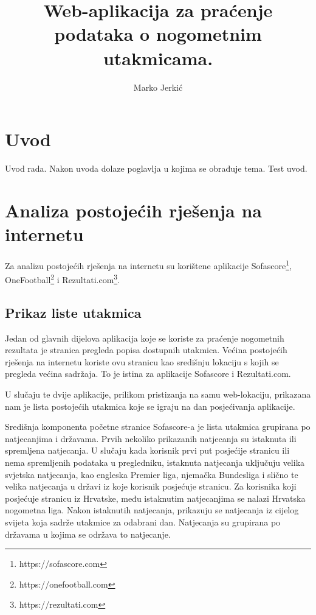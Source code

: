 \documentclass[times, utf8, zavrsni]{fer}
\begin{document}

\title{Web-aplikacija za praćenje podataka o nogometnim utakmicama.}

\author{Marko Jerkić}

\maketitle


\zahvala{}

\tableofcontents

\chapter{Uvod}
Uvod rada. Nakon uvoda dolaze poglavlja u kojima se obrađuje tema.
Test uvod.

\chapter{Analiza postojećih rješenja na internetu}
Za analizu postojećih rješenja na internetu su korištene aplikacije Sofascore\footnote{https://sofascore.com}, OneFootball\footnote{https://onefootball.com} i Rezultati.com\footnote{https://rezultati.com}.

\section{Prikaz liste utakmica}

Jedan od glavnih dijelova aplikacija koje se koriste za praćenje nogometnih rezultata je stranica pregleda popisa dostupnih utakmica.
Većina postojećih rješenja na internetu koriste ovu stranicu kao središnju lokaciju s kojih se pregleda većina sadržaja. To je istina za aplikacije Sofascore i Rezultati.com.

U slučaju te dvije aplikacije, prilikom pristizanja na samu web-lokaciju, prikazana nam je lista postojećih utakmica koje se igraju na dan posjećivanja aplikacije.

Središnja komponenta početne stranice Sofascore-a je lista utakmica grupirana po natjecanjima i državama. Prvih nekoliko prikazanih natjecanja su istaknuta ili spremljena natjecanja.
U slučaju kada korisnik prvi put posjećije stranicu ili nema spremljenih podataka u pregledniku, istaknuta natjecanja uključuju velika svjetska natjecanja,
kao engleska Premier liga, njemačka Bundesliga i slično te velika natjecanja u državi iz koje korisnik posjećuje stranicu.
Za korisnika koji posjećuje stranicu iz Hrvatske, među istaknutim natjecanjima se nalazi Hrvatska nogometna liga.
Nakon istaknutih natjecanja, prikazuju se natjecanja iz cijelog svijeta koja sadrže utakmice za odabrani dan. Natjecanja su grupirana po državama u kojima se održava to natjecanje.
\end{document}
